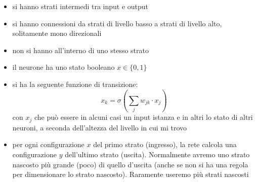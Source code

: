 \documentclass[a4paper,12pt, oneside]{book}
\begin{document}
\begin{itemize}
  \item si hanno strati intermedi tra input e output
  \item si hanno connessioni da strati di livello basso a strati di livello
  alto, solitamente mono direzionali
  \item non si hanno all'interno di uno stesso strato
  \item il neurone ha uno stato booleano $x\in\{0,1\}$
  \item si ha la seguente funzione di transizione:
  \[x_k=\sigma\left(\sum_{j}w_{jk}\cdot x_j\right)\]
  con $x_j$ che può essere in alcuni
  casi un input istanza e in altri lo stato di altri neuroni, a seconda
  dell'altezza del livello in cui mi trovo
  \item per ogni configurazione $x$ del primo strato (ingresso), la rete calcola
  una configurazione $y$ dell'ultimo strato (uscita). Normalmente avremo uno
  strato nascosto più grande (poco) di quello d'uscita (anche se non si ha una
  regola per dimensionare lo strato nascosto). Raramente useremo più strati
  nascosti
\end{itemize}
\end{document}
